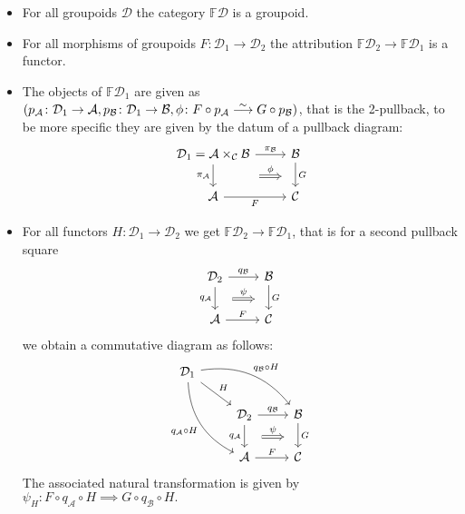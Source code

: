 \begin{itemize}
	\item 
	For all groupoids $ \mathcal{D} $ the category $ \mathbb{F} \mathcal{D} $ is a groupoid.
	
	\item 
	For all morphisms of groupoids $ F \colon \mathcal{D}_1 \to \mathcal{D}_2 $ the attribution $ \mathbb{F} \mathcal{D}_2 \to \mathbb{ F } \mathcal{D}_1 $ is a functor.
	
	\item 
	The objects of $ \mathbb{ F } \mathcal{D}_1 $ are given as $  ( p_{ \mathcal{ A } } \colon \mathcal{ D }_1 \to \mathcal{ A } , p_{ \mathcal{ B } } \colon \mathcal{ D }_1 \to \mathcal{ B } , \phi \colon F \circ p_{ \mathcal{ A } } \isomorphism  G \circ p_{ \mathcal{ B } } ) $,
	that is the 2-pullback, to be more specific they are given by the datum of a pullback diagram:
	\[
	\begin{tikzcd}	
		\mathcal{ D }_1 = \mathcal{ A } \times_{ \mathcal{ C } } \mathcal{ B }
		\ar[r, " \pi_{ \mathcal{ B } } "]
		\ar[r , shift right=4ex, shorten <=3pt, Rightarrow, shorten >=3pt, " \phi " ]
		\ar[d, " \pi_{ \mathcal{ A } }"']
		&
		\mathcal{ B }
		\ar[d, " G "]
		\\ 
		\mathcal{ A }
		\ar[r, " F "' ]
		&
		\mathcal{ C }
	\end{tikzcd}
	\]
	
	\item 
	For all functors $ H \colon \mathcal{ D }_1 \to \mathcal{ D }_2 $ we get $ \mathbb{ F } \mathcal{ D }_2 \to \mathbb{ F } \mathcal{ D }_1 $, that is for a second pullback square 
	\[
	\begin{tikzcd}	
		\mathcal{D}_2
		\ar[r, " q_{\mathcal{ B } } "]
		\ar[d, " q_{ \mathcal{ A } } "']
		\ar[r , shift right=4ex, shorten <=3pt, Rightarrow, shorten >=3pt, " \psi " ]
		&
		\mathcal{ B }
		\ar[d, " G "]
		\\
		\mathcal{ A } 
		\ar[r, " F "]
		&
		\mathcal{ C }
	\end{tikzcd}
	\]
	we obtain a commutative diagram as follows:
	\[
	\begin{tikzcd}
		\mathcal{ D }_1
		\ar[rrd, bend left, bend left, " q_{ \mathcal{ B } } \circ H "]
		\ar[rd, " H "]
		\ar[rdd, bend right," q_{ \mathcal{ A } } \circ H "']
		\\
		&
		\mathcal{ D }_2 
		\ar[r, " q_{ \mathcal{ B } }"]
		\ar[d, " q_{ \mathcal{ A } }"']
		\ar[r , shift right=4ex, shorten <=3pt, Rightarrow, shorten >=3pt, " \psi " ]
		&
		\mathcal{ B }
		\ar[d, " G "]
		\\
		&
		\mathcal{ A }
		\ar[r, " F "]
		&
		\mathcal{ C }
	\end{tikzcd}
	\]
	The associated natural transformation is given by 
	$\psi_H \colon F \circ q_{ \mathcal{A} } \circ H \implies G \circ q_{ \mathcal{ B } } \circ H.$
\end{itemize}

